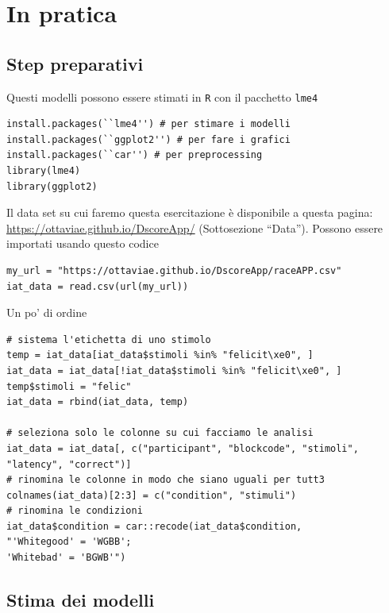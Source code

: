 \documentclass[compress]{beamer}
\begin{document}
\section{In pratica}

\subsection{Step preparativi}
\begin{frame}[fragile]
	Questi modelli possono essere stimati in \texttt{R} con il pacchetto \texttt{lme4}
	
	\begin{lstlisting}
install.packages(``lme4'') # per stimare i modelli
install.packages(``ggplot2'') # per fare i grafici
install.packages(``car'') # per preprocessing
library(lme4)
library(ggplot2)
	\end{lstlisting}

Il data set su cui faremo questa esercitazione è disponibile a questa pagina: \href{https://ottaviae.github.io/DscoreApp/}{https://ottaviae.github.io/DscoreApp/} (Sottosezione ``Data''). Possono essere importati usando questo codice
	
\begin{lstlisting}
my_url = "https://ottaviae.github.io/DscoreApp/raceAPP.csv"
iat_data = read.csv(url(my_url))

\end{lstlisting}
\end{frame}

\begin{frame}[fragile]{Un po' di ordine}

\begin{lstlisting}
# sistema l'etichetta di uno stimolo 
temp = iat_data[iat_data$stimoli %in% "felicit\xe0", ]
iat_data = iat_data[!iat_data$stimoli %in% "felicit\xe0", ]
temp$stimoli = "felic"
iat_data = rbind(iat_data, temp)

# seleziona solo le colonne su cui facciamo le analisi
iat_data = iat_data[, c("participant", "blockcode", "stimoli", "latency", "correct")]
# rinomina le colonne in modo che siano uguali per tutt3
colnames(iat_data)[2:3] = c("condition", "stimuli")
# rinomina le condizioni
iat_data$condition = car::recode(iat_data$condition,
"'Whitegood' = 'WGBB';
'Whitebad' = 'BGWB'")
\end{lstlisting}

\end{frame}

\subsection{Stima dei modelli}
\end{document}
